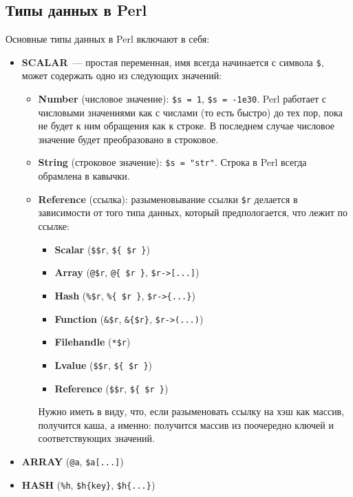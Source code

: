 \subsection{Типы данных в Perl}
Основные типы данных в Perl включают в себя:
\begin{itemize}
  \item \textbf{SCALAR}~--- простая переменная, имя всегда начинается с символа \verb|$|, может содержать одно из следующих значений:
  \begin{itemize}
    \item \textbf{Number} (числовое значение): \verb|$s = 1|, \verb|$s = -1e30|.
      Perl работает с числовыми значениями как с числами (то есть быстро) до тех пор, пока не будет к ним обращения как к строке. В последнем случае числовое значение будет преобразовано в строковое.

    \item \textbf{String} (строковое значение): \verb|$s = "str"|. Строка в Perl всегда обрамлена в кавычки.
    \item \textbf{Reference} (ссылка): разыменовывание ссылки \verb|$r| делается в зависимости от того типа данных, который предпологается, что лежит по ссылке:
      \begin{itemize}
        \item \textbf{Scalar} (\verb|$$r|, \verb|${ $r }|)
        \item \textbf{Array} (\verb|@$r|, \verb|@{ $r }|, \verb|$r->[...]|)
        \item \textbf{Hash} (\verb|%$r|, \verb|%{ $r }|, \verb|$r->{...}|)
        \item \textbf{Function} (\verb|&$r|, \verb|&{$r}|, \verb|$r->(...)|)
        \item \textbf{Filehandle} (\verb|*$r|)
        \item \textbf{Lvalue} (\verb|$$r|, \verb|${ $r }|)
        \item \textbf{Reference} (\verb|$$r|, \verb|${ $r }|)
      \end{itemize}
    Нужно иметь в виду, что, если разыменовать ссылку на хэш как массив, получится каша, а именно: получится массив из поочередно ключей и соответствующих значений.
  \end{itemize}
  \item \textbf{ARRAY} (\verb|@a|, \verb|$a[...]|)
  \item \textbf{HASH} (\verb|%h|, \verb|$h{key}|, \verb|$h{...}|)
\end{itemize}


